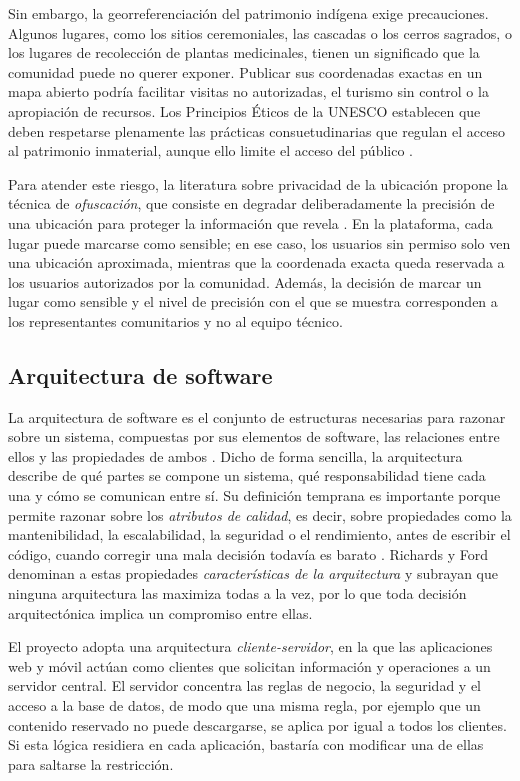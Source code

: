 Sin embargo, la georreferenciación del patrimonio indígena exige precauciones. Algunos lugares, como los sitios ceremoniales, las cascadas o los cerros sagrados, o los lugares de recolección de plantas medicinales, tienen un significado que la comunidad puede no querer exponer. Publicar sus coordenadas exactas en un mapa abierto podría facilitar visitas no autorizadas, el turismo sin control o la apropiación de recursos. Los Principios Éticos de la UNESCO establecen que deben respetarse plenamente las prácticas consuetudinarias que regulan el acceso al patrimonio inmaterial, aunque ello limite el acceso del público \cite{unesco2015ethical}.

Para atender este riesgo, la literatura sobre privacidad de la ubicación propone la técnica de \textit{ofuscación}, que consiste en degradar deliberadamente la precisión de una ubicación para proteger la información que revela \cite{duckham2005obfuscation}. En la plataforma, cada lugar puede marcarse como sensible; en ese caso, los usuarios sin permiso solo ven una ubicación aproximada, mientras que la coordenada exacta queda reservada a los usuarios autorizados por la comunidad. Además, la decisión de marcar un lugar como sensible y el nivel de precisión con el que se muestra corresponden a los representantes comunitarios y no al equipo técnico.

\subsection{Arquitectura de software}
La arquitectura de software es el conjunto de estructuras necesarias para razonar sobre un sistema, compuestas por sus elementos de software, las relaciones entre ellos y las propiedades de ambos \cite{bass2021software}. Dicho de forma sencilla, la arquitectura describe de qué partes se compone un sistema, qué responsabilidad tiene cada una y cómo se comunican entre sí. Su definición temprana es importante porque permite razonar sobre los \textit{atributos de calidad}, es decir, sobre propiedades como la mantenibilidad, la escalabilidad, la seguridad o el rendimiento, antes de escribir el código, cuando corregir una mala decisión todavía es barato \cite{bass2021software}. Richards y Ford \cite{richards2020fundamentals} denominan a estas propiedades \textit{características de la arquitectura} y subrayan que ninguna arquitectura las maximiza todas a la vez, por lo que toda decisión arquitectónica implica un compromiso entre ellas.

El proyecto adopta una arquitectura \textit{cliente-servidor}, en la que las aplicaciones web y móvil actúan como clientes que solicitan información y operaciones a un servidor central. El servidor concentra las reglas de negocio, la seguridad y el acceso a la base de datos, de modo que una misma regla, por ejemplo que un contenido reservado no puede descargarse, se aplica por igual a todos los clientes. Si esta lógica residiera en cada aplicación, bastaría con modificar una de ellas para saltarse la restricción.

